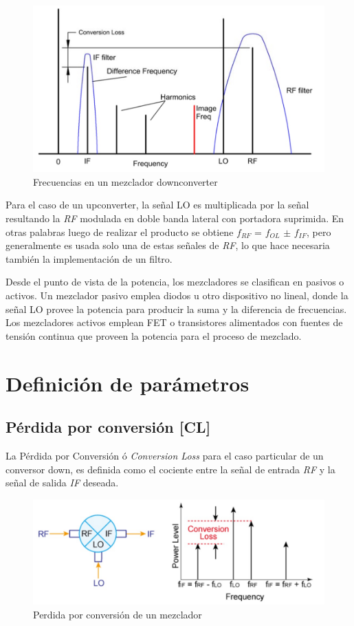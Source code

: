 \documentclass[twocolumn]{article}
\begin{document}
\begin{figure}[!ht]
  \centering    
	\includegraphics[scale=0.4]{imagenes/fig2.jpg}
	\caption{Frecuencias en un mezclador downconverter}\label{fig:fig2}
\end{figure}

Para el caso de un upconverter, la señal LO es multiplicada por la señal  resultando la \textit{RF} modulada en doble banda lateral con portadora suprimida. En otras palabras luego de realizar el producto se obtiene $f_{RF}$ = $f_{OL}$ $\pm$ $f_{IF}$, pero generalmente es usada solo una de estas señales de \textit{RF}, lo que hace necesaria también la implementación de un filtro.

Desde el punto de vista de la potencia, los mezcladores se clasifican en pasivos o activos. Un mezclador pasivo emplea diodos u otro dispositivo no lineal, donde la señal LO provee la potencia para producir la suma y la diferencia de frecuencias. Los mezcladores activos emplean FET o transistores alimentados con fuentes de tensión continua que proveen la potencia para el proceso de mezclado. 

\section{Definición de parámetros}
\subsection{Pérdida por conversión [CL]}
La Pérdida por Conversión ó \textit{Conversion Loss} para el caso particular de un conversor down, es definida como el cociente entre la señal de entrada \textit{RF} y la señal de salida \textit{IF} deseada.

\begin{figure}[!ht]
  \centering    
	\includegraphics[scale=0.38]{imagenes/fig3.jpg}
	\caption{Perdida por conversión de un mezclador}\label{fig:fig3}
\end{figure}
\end{document}
